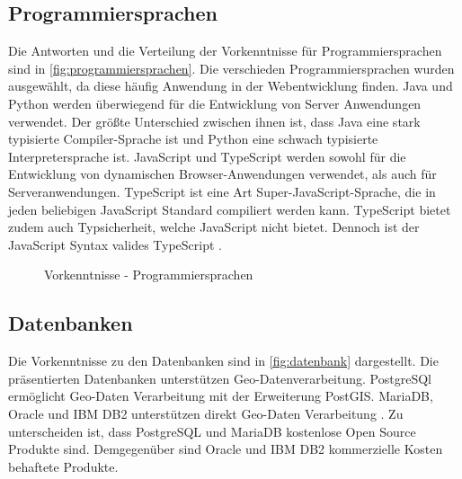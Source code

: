 \subsection{Programmiersprachen}
Die Antworten und die Verteilung der Vorkenntnisse für Programmiersprachen sind in \autoref{fig:programmiersprachen}.
Die verschieden Programmiersprachen wurden ausgewählt, da diese häufig Anwendung in der Webentwicklung finden.
Java und Python werden überwiegend für die Entwicklung von Server Anwendungen verwendet. Der größte Unterschied zwischen ihnen ist, dass Java eine stark typisierte Compiler-Sprache ist und Python eine schwach typisierte Interpretersprache ist.
JavaScript und TypeScript werden sowohl für die Entwicklung von dynamischen Browser-Anwendungen verwendet, als auch für Serveranwendungen.
TypeScript ist eine Art Super-JavaScript-Sprache, die in jeden beliebigen JavaScript Standard compiliert werden kann. 
TypeScript bietet zudem auch Typsicherheit, welche JavaScript nicht bietet.
Dennoch ist der JavaScript Syntax valides TypeScript \autocite[vgl.][]{Microsoft.od}.

\begin{figure}[H]
	\caption{Vorkenntnisse - Programmiersprachen}
	\label{fig:programmiersprachen}
\end{figure}

\subsection{Datenbanken}
Die Vorkenntnisse zu den Datenbanken sind in \autoref{fig:datenbank} dargestellt. Die präsentierten Datenbanken unterstützen Geo-Datenverarbeitung.
PostgreSQl ermöglicht Geo-Daten Verarbeitung mit der Erweiterung PostGIS. MariaDB, Oracle und IBM DB2 unterstützen direkt Geo-Daten Verarbeitung \autocite[vgl.][]{PostGIS.od} \autocite[vgl.][]{MariaDB.od-b} \autocite[vgl.][]{Oracle.od} \autocite{IBM.od}.
Zu unterscheiden ist, dass PostgreSQL und MariaDB kostenlose Open Source Produkte sind.
Demgegenüber sind Oracle und IBM DB2 kommerzielle Kosten behaftete Produkte.


